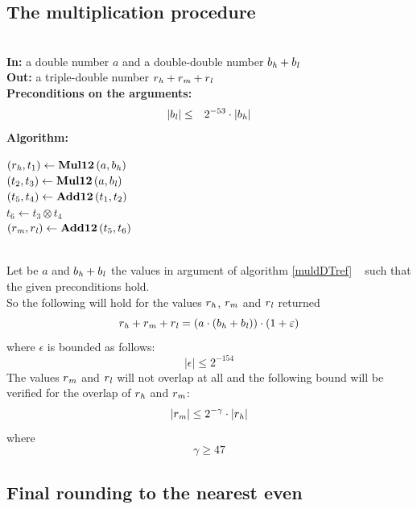 \subsection{The multiplication procedure \MuldDT}
\begin{algorithm}[\MuldDT] \label{muldDTref} ~ \\
{\bf In:} a double number $a$  and a double-double number $b_{\mathit{h}} + b_{\mathit{l}}$ \\
{\bf Out:} a triple-double number $r_{\mathit{h}} + r_{\mathit{m}} + r_{\mathit{l}}$ \\
{\bf Preconditions on the arguments:}
\begin{eqnarray*}
\left \vert b_{\mathit{l}} \right \vert & \leq & 2^{-53} \cdot \left \vert b_{\mathit{h}} \right \vert 
\end{eqnarray*}
{\bf Algorithm:} \\
\begin{center}
\begin{minipage}[b]{60mm}
$\left( r_{\mathit{h}}, t_1 \right) \gets \mathbf{Mul12}\left( a, b_{\mathit{h}} \right)$ \\
$\left( t_2, t_3 \right) \gets \mathbf{Mul12}\left( a, b_{\mathit{l}} \right)$ \\
$\left( t_5, t_4 \right) \gets \mathbf{Add12}\left( t_1, t_2 \right)$ \\
$t_6 \gets t_3 \otimes t_4$ \\
$\left( r_{\mathit{m}}, r_{\mathit{l}} \right) \gets \mathbf{Add12}\left( t_5, t_6 \right)$ 
\end{minipage}
\end{center}
\end{algorithm}
\begin{theorem} ~ \\
Let be $a$ and $b_{\mathit{h}} + b_{\mathit{l}}$ the values in argument of algorithm \ref{muldDTref} \MuldDT~ such that 
the given preconditions hold.\\
So the following will hold for the values $r_{\mathit{h}}$, $r_{\mathit{m}}$ and $r_{\mathit{l}}$ returned
$$r_{\mathit{h}} + r_{\mathit{m}} + r_{\mathit{l}} = \left( a \cdot \left( b_{\mathit{h}} + b_{\mathit{l}} \right)\right) \cdot \left(1 + \varepsilon\right)$$
where $\epsilon$ is bounded as follows:
$$\left \vert \epsilon \right \vert \leq 2^{-154}$$
The values $r_{\mathit{m}}$ and  $r_{\mathit{l}}$ will not overlap at all and the following bound will be verified for the overlap of 
$r_{\mathit{h}}$ and $r_{\mathit{m}}$:
$$\left \vert r_{\mathit{m}} \right \vert \leq 2^{-\gamma} \cdot \left \vert r_{\mathit{h}} \right \vert$$
where
$$\gamma \geq 47$$
\end{theorem}


\subsection{Final rounding to the nearest even}

